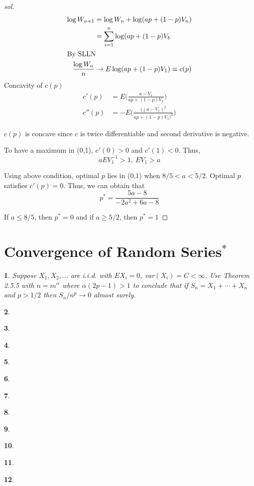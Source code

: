 \documentclass{report}
\newtheorem{ex}{}[section]
\begin{document}
\begin{proof}[sol]
\begin{align*}
\log W_{n+1} &= \log W_n + \log (ap + (1-p)V_n)\\
&=\sum_{i=1}^n \log(ap + (1-p)V_b\\
\intertext{By SLLN}
\frac{\log W_n}{n} &\to E\log(ap + (1-p) V_1) \equiv c(p)
\end{align*}
Concavity of $c(p)$
\begin{align*}
c'(p) &=  E\bigg(\frac{a - V_1}{ap + (1-p)V_1}\bigg)\\
c''(p) &= -E\bigg(\frac{((a-V_1)^2}{ap + (1-p)V_1)^2}\bigg)
\end{align*}

$c(p)$ is concave since $c$ is twice differentiable and second derivative is negative.

To have a maximum in (0,1), $c'(0) > 0$ and $c'(1) < 0$. Thus,
\[aEV_1^{-1} > 1, \ EV_1 > a\]

Using above condition, optimal $p$ lies in (0,1) when $8/5 <a < 5/2$. Optimal $p$ satisfies $c'(p) = 0$. Thus, we can obtain that
\[p^* = \frac{5a - 8}{-2a^2 +6a - 8}\]

If $a \le 8/5$, then $p^* = 0$ and if $a \ge 5/2$, then $p^* =1$
\end{proof}

\section{Convergence of Random Series$^*$}
\begin{ex}
Suppose $X_1,X_2,...$ are i.i.d. with $EX_i = 0$, var$(X_i) = C <\infty$. Use Theorem 2.5.5 with $n = m^\alpha$ where $\alpha(2p - 1) > 1$ to conclude that if $S_n = X_1 + \dotsb + X_n$ and $p > 1/2$ then $S_n/n^p \to 0$ almost surely.
\end{ex}
\begin{ex}
\end{ex}
\begin{ex}
\end{ex}
\begin{ex}
\end{ex}
\begin{ex}
\end{ex}
\begin{ex}
\end{ex}
\begin{ex}
\end{ex}
\begin{ex}
\end{ex}
\begin{ex}
\end{ex}
\begin{ex}
\end{ex}
\begin{ex}
\end{ex}
\begin{ex}
\end{ex}
\end{document}
